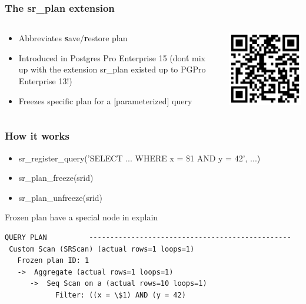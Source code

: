 \documentclass{beamer}
\begin{document}
\begin{frame}[fragile]\frametitle{The sr\_plan extension}
\begin{columns}\begin{column}{0.8\textwidth}
\begin{itemize}
  \item Abbreviates \textbf{s}ave/\textbf{r}estore plan 
  \item Introduced in Postgres Pro Enterprise 15 (don\'t mix up with the extension sr\_plan existed up to PGPro Enterprise 13!)
  \item Freezes specific plan for a [parameterized] query
\end{itemize}
\end{column}
\begin{column}{0.2\textwidth}
  \includegraphics[scale=0.7]{srplanqr}
\end{column}
\end{columns}
\end{frame}

\begin{frame}[fragile]\frametitle{How it works}
\begin{itemize}
  \item sr\_register\_query('SELECT ... WHERE x = \$1 AND y = 42', ...)
  \item sr\_plan\_freeze(srid)
  \item sr\_plan\_unfreeze(srid)
\end{itemize}
\begin{block}{Frozen plan have a special node in explain}
\begin{lstlisting}[basicstyle=\footnotesize]
                            QUERY PLAN          ------------------------------------------------
 Custom Scan (SRScan) (actual rows=1 loops=1)
   Frozen plan ID: 1
   ->  Aggregate (actual rows=1 loops=1)
      ->  Seq Scan on a (actual rows=10 loops=1)
            Filter: ((x = \$1) AND (y = 42)
\end{lstlisting}\end{block}
\end{frame}
\end{document}
